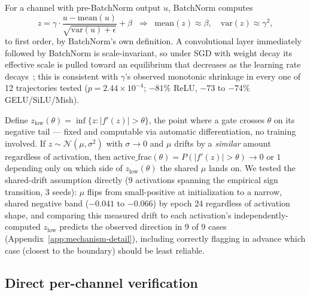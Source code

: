 \documentclass{article}
\begin{document}
For a channel with pre-BatchNorm output $u$, BatchNorm computes
\begin{equation}
  z = \gamma \cdot \frac{u - \mathrm{mean}(u)}{\sqrt{\mathrm{var}(u)+\epsilon}} + \beta
  \;\;\Rightarrow\;\;
  \mathrm{mean}(z) \approx \beta, \quad \mathrm{var}(z) \approx \gamma^2,
\end{equation}
to first order, by BatchNorm's own definition. A convolutional layer immediately followed by BatchNorm is scale-invariant, so under SGD with weight decay its effective scale is pulled toward an equilibrium that decreases as the learning rate decays~\citep{vanlaarhoven2017l2,hoffer2018norm}; this is consistent with $\gamma$'s observed monotonic shrinkage in every one of 12 trajectories tested ($p=2.44\times10^{-4}$; $-81\%$ ReLU, $-73$ to $-74\%$ GELU/SiLU/Mish).

Define $z_{\mathrm{low}}(\theta) = \inf\{z : |f'(z)| > \theta\}$, the point where a gate crosses $\theta$ on its negative tail --- fixed and computable via automatic differentiation, no training involved. If $z\sim\mathcal{N}(\mu,\sigma^2)$ with $\sigma\to0$ and $\mu$ drifts by a \emph{similar} amount regardless of activation, then $\mathrm{active\_frac}(\theta) = P(|f'(z)|>\theta)\to0$ or $1$ depending only on which side of $z_{\mathrm{low}}(\theta)$ the shared $\mu$ lands on. We tested the shared-drift assumption directly (9 activations spanning the empirical sign transition, 3 seeds): $\mu$ flips from small-positive at initialization to a narrow, shared negative band ($-0.041$ to $-0.066$) by epoch 24 regardless of activation shape, and comparing this measured drift to each activation's independently-computed $z_{\mathrm{low}}$ predicts the observed direction in 9 of 9 cases (Appendix~\ref{app:mechanism-detail}), including correctly flagging in advance which case (closest to the boundary) should be least reliable.

\subsection{Direct per-channel verification}
\label{sec:channel_mechanism}
\end{document}
